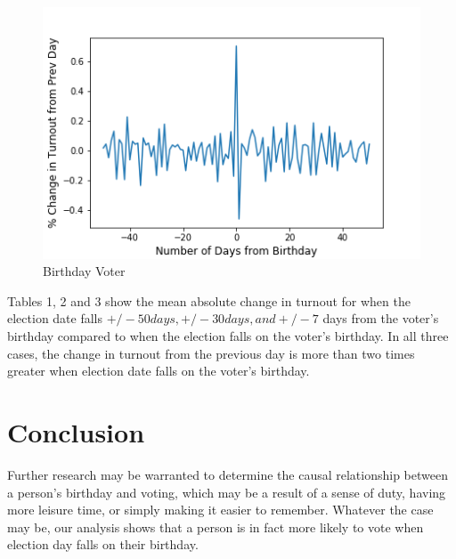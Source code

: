\documentclass[12pt, letterpaper]{article}
\begin{document}
\begin{figure}[H]
\centering
 \includegraphics[scale=.7]{../figs/fig1_turnout_chg_from_prev_day.png}
 \caption{Birthday Voter}
 \label{fig:birthday}
\end{figure}





Tables 1, 2 and 3 show the mean absolute change in turnout for when the election date falls $+/- 50 days,+/-  30 days, and +/- 7$ days from the voter's birthday compared to when the election falls on the voter's birthday. In all three cases, the change in turnout from the previous day is more than two times greater when election date falls on the voter’s birthday.









\section{Conclusion}
Further research may be warranted to determine the causal relationship between a person's birthday and voting, which may be a result of a sense of duty, having more leisure time, or simply making it easier to remember. Whatever the case may be, our analysis shows that a person is in fact more likely to vote when election day falls on their birthday. 
\end{document}
